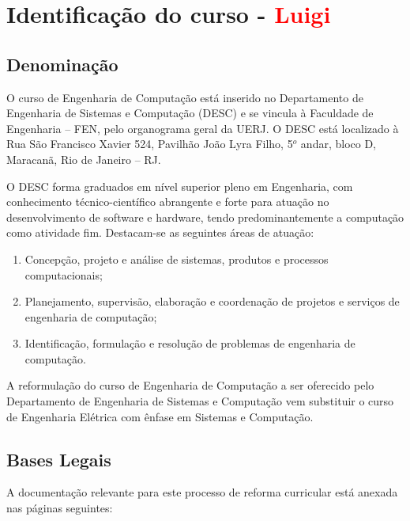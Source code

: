 \chapter{Identificação do curso - \textcolor{red}{Luigi}}

\section{Denominação}

O curso de Engenharia de Computação está inserido no Departamento de Engenharia de Sistemas e Computação (DESC) e se vincula à Faculdade de Engenharia – FEN, pelo organograma geral da UERJ. O DESC está localizado à Rua São Francisco Xavier 524, Pavilhão João Lyra Filho, 5$^{o}$ andar, bloco D, Maracanã, Rio de Janeiro – RJ.

O DESC forma graduados em nível superior pleno em Engenharia, com conhecimento técnico-científico abrangente e forte para atuação no desenvolvimento de software e hardware, tendo predominantemente a computação como atividade fim. Destacam-se as seguintes áreas de atuação:

\begin{enumerate}
	\item Concepção, projeto e análise de sistemas, produtos e processos computacionais;
	\item Planejamento, supervisão, elaboração e coordenação de projetos e serviços de engenharia de computação;
	\item Identificação, formulação e resolução de problemas de engenharia de computação.
\end{enumerate}

A reformulação do curso de Engenharia de Computação a ser oferecido pelo Departamento de Engenharia de Sistemas e Computação vem substituir o curso de Engenharia Elétrica com ênfase em Sistemas e Computação.

\section{Bases Legais}

A documentação relevante para este processo de reforma curricular está anexada nas páginas seguintes:

